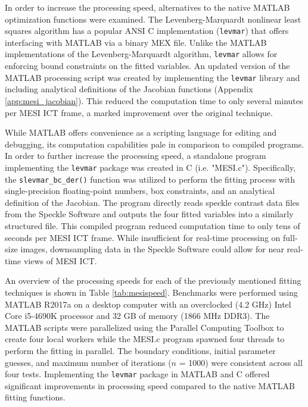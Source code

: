 In order to increase the processing speed, alternatives to the native MATLAB optimization functions were examined. The Levenberg-Marquardt nonlinear least squares algorithm has a popular ANSI C implementation (\texttt{levmar}) \cite{Lourakis:J2fCMU5i} that offers interfacing with MATLAB via a binary MEX file. Unlike the MATLAB implementations of the Levenberg-Marquardt algorithm, \texttt{levmar} allows for enforcing bound constraints on the fitted variables. An updated version of the MATLAB processing script was created by implementing the \texttt{levmar} library and including analytical definitions of the Jacobian functions (Appendix \ref{app:mesi_jacobian}). This reduced the computation time to only several minutes per MESI ICT frame, a marked improvement over the original technique.

While MATLAB offers convenience as a scripting language for editing and debugging, its computation capabilities pale in comparison to compiled programs. In order to further increase the processing speed, a standalone program implementing the \texttt{levmar} package was created in C (i.e. "MESI.c"). Specifically, the \texttt{slevmar\_bc\_der()} function was utilized to perform the fitting process with single-precision floating-point numbers, box constraints, and an analytical definition of the Jacobian. The program directly reads speckle contrast data files from the Speckle Software and outputs the four fitted variables into a similarly structured file. This compiled program reduced computation time to only tens of seconds per MESI ICT frame. While insufficient for real-time processing on full-size images, downsampling data in the Speckle Software could allow for near real-time views of MESI ICT.

An overview of the processing speeds for each of the previously mentioned fitting techniques is shown in Table \ref{tab:mesispeed}. Benchmarks were performed using MATLAB R2017a on a desktop computer with an overclocked (4.2 GHz) Intel Core i5-4690K processor and 32 GB of memory (1866 MHz DDR3). The MATLAB scripts were parallelized using the Parallel Computing Toolbox to create four local workers while the MESI.c program spawned four threads to perform the fitting in parallel. The boundary conditions, initial parameter guesses, and maximum number of iterations ($n$ = 1000) were consistent across all four tests. Implementing the \texttt{levmar} package in MATLAB and C offered significant improvements in processing speed compared to the native MATLAB fitting functions.

